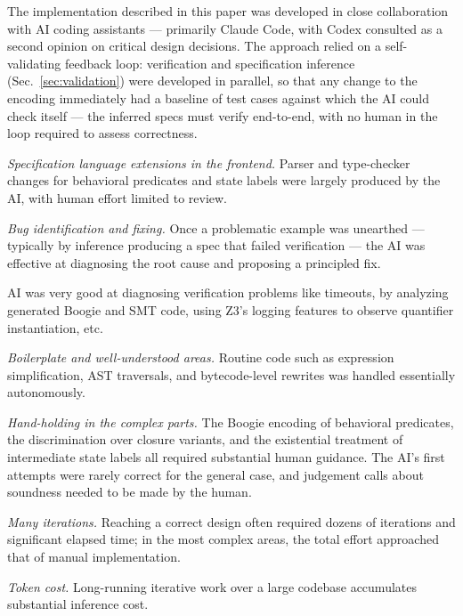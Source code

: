 \label{sec:ai-development}

The implementation described in this paper was developed in close collaboration with AI coding assistants --- primarily Claude Code, with Codex consulted as a second opinion on critical design decisions.
The approach relied on a self-validating feedback loop: verification and specification inference (Sec.~\ref{sec:validation}) were developed in parallel, so that any change to the encoding immediately had a baseline of test cases against which the AI could check itself --- the inferred specs must verify end-to-end, with no human in the loop required to assess correctness.

\begin{Itemize}
    \item \emph{Specification language extensions in the frontend.}  Parser and type-checker changes for behavioral predicates and state labels were largely produced by the AI, with human effort limited to review.
    \item \emph{Bug identification and fixing.}  Once a problematic example was unearthed --- typically by inference producing a spec that failed verification --- the AI was effective at diagnosing the root cause and proposing a principled fix.
    \item AI was very good at diagnosing verification problems like timeouts, by analyzing generated Boogie and SMT code, using Z3's logging features to observe quantifier instantiation, etc.
    \item \emph{Boilerplate and well-understood areas.}  Routine code such as expression simplification, AST traversals, and bytecode-level rewrites was handled essentially autonomously.
\end{Itemize}

\begin{Itemize}
    \item \emph{Hand-holding in the complex parts.}  The Boogie encoding of behavioral predicates, the discrimination over closure variants, and the existential treatment of intermediate state labels all required substantial human guidance.
    The AI's first attempts were rarely correct for the general case, and judgement calls about soundness needed to be made by the human.
    \item \emph{Many iterations.}  Reaching a correct design often required dozens of iterations and significant elapsed time; in the most complex areas, the total effort approached that of manual implementation.
    \item \emph{Token cost.}  Long-running iterative work over a large codebase accumulates substantial inference cost.
\end{Itemize}

